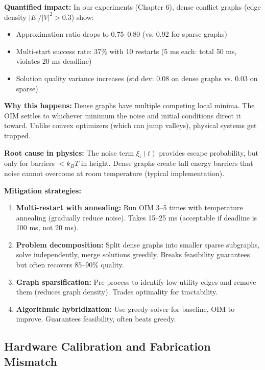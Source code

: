 \textbf{Quantified impact:} In our experiments (Chapter 6), dense conflict graphs (edge density $|E|/|V|^2 > 0.3$) show:
\begin{itemize}
\item Approximation ratio drops to 0.75--0.80 (vs. 0.92 for sparse graphs)
\item Multi-start success rate: 37\% with 10 restarts (5 ms each: total 50 ms, violates 20 ms deadline)
\item Solution quality variance increases (std dev: 0.08 on dense graphs vs. 0.03 on sparse)
\end{itemize}

\textbf{Why this happens:} Dense graphs have multiple competing local minima. The OIM settles to whichever minimum the noise and initial conditions direct it toward. Unlike convex optimizers (which can jump valleys), physical systems get trapped.

\textbf{Root cause in physics:} The noise term $\xi_i(t)$ provides escape probability, but only for barriers $< k_B T$ in height. Dense graphs create tall energy barriers that noise cannot overcome at room temperature (typical implementation).

\textbf{Mitigation strategies:}
\begin{enumerate}
\item \textbf{Multi-restart with annealing:} Run OIM 3--5 times with temperature annealing (gradually reduce noise). Takes 15--25 ms (acceptable if deadline is 100 ms, not 20 ms).

\item \textbf{Problem decomposition:} Split dense graphs into smaller sparse subgraphs, solve independently, merge solutions greedily. Breaks feasibility guarantees but often recovers 85--90\% quality.

\item \textbf{Graph sparsification:} Pre-process to identify low-utility edges and remove them (reduces graph density). Trades optimality for tractability.

\item \textbf{Algorithmic hybridization:} Use greedy solver for baseline, OIM to improve. Guarantees feasibility, often beats greedy.
\end{enumerate}

\subsection{Hardware Calibration and Fabrication Mismatch}

